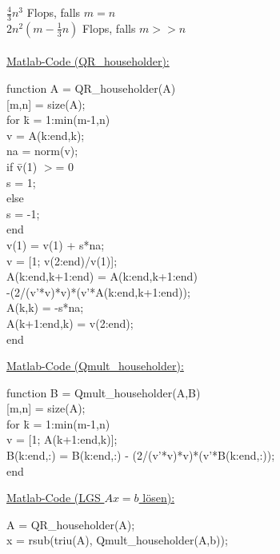 \documentclass[a4paper,twocolumn,10pt]{article}
\begin{document}
$\frac{4}{3}n^3$ Flops, falls $m=n$\\
$2n^2\left(m-\frac{1}{3}n\right)$ Flops, falls $m>>n$\\\\
\underline{Matlab-Code (QR\_householder):}
\begin{tabbing}
function A = QR\_householder(A)\\
{[}m,n] = size(A);\\
for \=k = 1:min(m-1,n)\\
    \>v = A(k:end,k);\\
    \>na = norm(v);\\
    \>if \=v(1) $>$= 0\\
    \>   \>s = 1;\\
    \>else\\
    \>    \>s = -1;\\
    \>end  \\
    \>v(1) = v(1) + s*na;\\
    \>v = [1; v(2:end)/v(1)];\\
    \>A(k:end,k+1:end) = A(k:end,k+1:end)\\
    \>-(2/(v'*v)*v)*(v'*A(k:end,k+1:end));\\
    \>A(k,k) = -s*na;\\
    \>A(k+1:end,k) = v(2:end);\\
end
\end{tabbing}
\underline{Matlab-Code (Qmult\_householder):}
\begin{tabbing}
function B = Qmult\_householder(A,B)\\
{[}m,n] = size(A);\\
for \=k = 1:min(m-1,n)\\
    \>v = [1; A(k+1:end,k)];\\
    \>B(k:end,:) = B(k:end,:) - (2/(v'*v)*v)*(v'*B(k:end,:));\\
end
\end{tabbing}
\underline{Matlab-Code (LGS $Ax=b$ lösen):}
\begin{tabbing}
A = QR\_householder(A);\\
x = rsub(triu(A), Qmult\_householder(A,b));
\end{tabbing}
\end{document}
